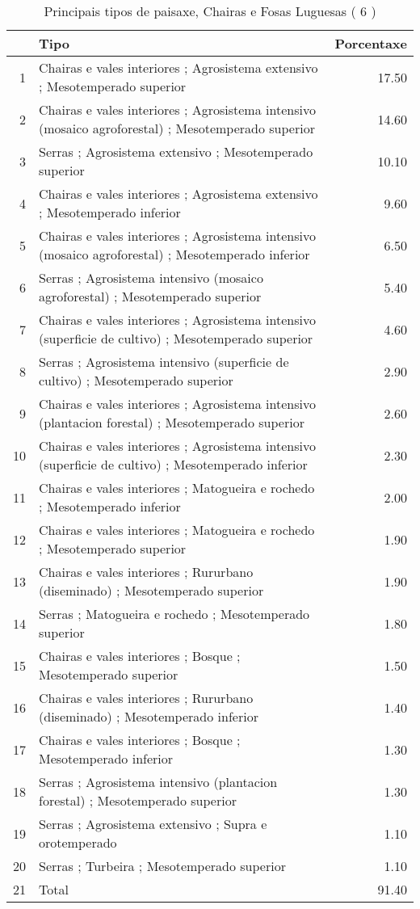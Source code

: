 \begin{table}[p]
\centering
\caption{Principais tipos de paisaxe,  Chairas e Fosas Luguesas ( 6 )} 
\label{Tipos 6}
\begin{tabular}{rlr}
  \hline
 & Tipo & Porcentaxe \\ 
  \hline
1 & Chairas e vales interiores ; Agrosistema extensivo ; Mesotemperado superior & 17.50 \\ 
  2 & Chairas e vales interiores ; Agrosistema intensivo (mosaico agroforestal) ; Mesotemperado superior & 14.60 \\ 
  3 & Serras ; Agrosistema extensivo ; Mesotemperado superior & 10.10 \\ 
  4 & Chairas e vales interiores ; Agrosistema extensivo ; Mesotemperado inferior & 9.60 \\ 
  5 & Chairas e vales interiores ; Agrosistema intensivo (mosaico agroforestal) ; Mesotemperado inferior & 6.50 \\ 
  6 & Serras ; Agrosistema intensivo (mosaico agroforestal) ; Mesotemperado superior & 5.40 \\ 
  7 & Chairas e vales interiores ; Agrosistema intensivo (superficie de cultivo) ; Mesotemperado superior & 4.60 \\ 
  8 & Serras ; Agrosistema intensivo (superficie de cultivo) ; Mesotemperado superior & 2.90 \\ 
  9 & Chairas e vales interiores ; Agrosistema intensivo (plantacion forestal) ; Mesotemperado superior & 2.60 \\ 
  10 & Chairas e vales interiores ; Agrosistema intensivo (superficie de cultivo) ; Mesotemperado inferior & 2.30 \\ 
  11 & Chairas e vales interiores ; Matogueira e rochedo ; Mesotemperado inferior & 2.00 \\ 
  12 & Chairas e vales interiores ; Matogueira e rochedo ; Mesotemperado superior & 1.90 \\ 
  13 & Chairas e vales interiores ; Rururbano (diseminado) ; Mesotemperado superior & 1.90 \\ 
  14 & Serras ; Matogueira e rochedo ; Mesotemperado superior & 1.80 \\ 
  15 & Chairas e vales interiores ; Bosque ; Mesotemperado superior & 1.50 \\ 
  16 & Chairas e vales interiores ; Rururbano (diseminado) ; Mesotemperado inferior & 1.40 \\ 
  17 & Chairas e vales interiores ; Bosque ; Mesotemperado inferior & 1.30 \\ 
  18 & Serras ; Agrosistema intensivo (plantacion forestal) ; Mesotemperado superior & 1.30 \\ 
  19 & Serras ; Agrosistema extensivo ; Supra e orotemperado & 1.10 \\ 
  20 & Serras ; Turbeira ; Mesotemperado superior & 1.10 \\ 
  21 & Total & 91.40 \\ 
   \hline
\end{tabular}
\end{table}
